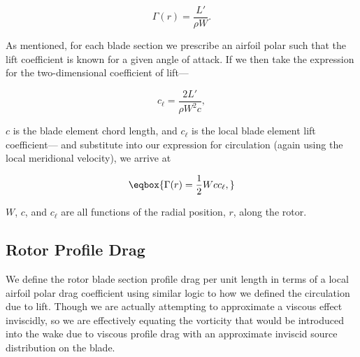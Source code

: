 \begin{equation}
    \Gamma(r) = \frac{L'}{\rho W}.
\end{equation}

\noindent As mentioned, for each blade section we prescribe an airfoil polar such that the lift coefficient is known for a given angle of attack.
%
If we then take the expression for the two-dimensional coefficient of lift---

\begin{equation}
    c_\ell = \frac{2 L'}{\rho W^2 c},
\end{equation}

\where \(c\) is the blade element chord length, and \(c_\ell\) is the local blade element lift coefficient--- %
 and substitute into our expression for circulation (again using the local meridional velocity), we arrive at

\begin{equation}
    \label{eqn:bladeelementcirculationrotor}
    \eqbox{
        \Gamma(r) = \frac{1}{2} W c c_\ell,
        }
\end{equation}


%

\where \(W\), \(c\), and \(c_\ell\) %
are all functions of the radial position, \(r\), along the rotor.



\subsection{Rotor Profile Drag}
\label{ssec:rotorsourcestrengths}

We define the rotor blade section profile drag per unit length in terms of a local airfoil polar drag coefficient using similar logic to how we defined the circulation due to lift.
%
Though we are actually attempting to approximate a viscous effect inviscidly, so we are effectively equating the vorticity that would be introduced into the wake due to viscous profile drag with an approximate inviscid source distribution on the blade.


